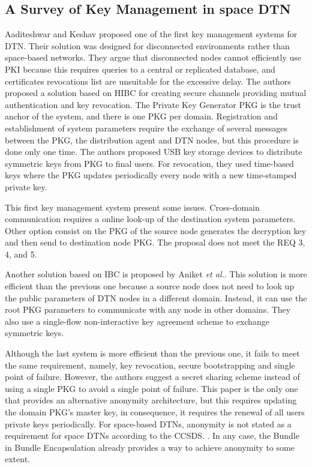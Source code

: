 \subsection{A Survey of Key Management in space DTN}

Aaditeshwar and Keshav \cite{seth2005practical} proposed one of the first key management systems for DTN. Their solution was designed for disconnected environments rather than space-based networks. They argue that disconnected nodes cannot efficiently use PKI because this requires queries to a central or replicated database, and certificates revocations list are unsuitable for the excessive delay. The authors proposed a solution based on HIBC for creating secure channels providing mutual authentication and key revocation. The Private Key Generator PKG is the trust anchor of the system, and there is one PKG per domain. Registration and establishment of system parameters require the exchange of several messages between the PKG, the distribution agent and DTN nodes, but this procedure is done only one time. The authors proposed USB key storage devices to distribute symmetric keys from PKG to final users. For revocation, they used time-based keys where the PKG updates periodically every node with a new time-stamped private key. 

This first key management system present some issues. Cross-domain communication requires a online look-up of the destination system parameters. Other option consist on the PKG of the source node generates the decryption key and then send to destination node PKG. The proposal does not meet the REQ 3, 4, and 5.


Another solution based on IBC is proposed by Aniket \textit{et al.}\cite{kate2007anonymity}. This solution is more efficient than the previous one because a source node does not need to look up the public parameters of DTN nodes in a different domain. Instead, it can use the root PKG parameters to communicate with any node in other domains. They also use a single-flow non-interactive key agreement scheme to exchange symmetric keys.

Although the last system is more efficient than the previous one, it fails to meet the same requirement, namely, key revocation, secure bootstrapping and single point of failure. However, the authors suggest a secret sharing scheme instead of using a single PKG to avoid a single point of failure. This paper is the only one that provides an alternative anonymity architecture, but this requires updating the domain PKG's master key, in consequence, it requires the renewal of all users private keys periodically. For space-based DTNs, anonymity is not stated as a requirement for space DTNs according to the CCSDS. \cite{book2011space}. In any case, the Bundle in Bundle Encapsulation \cite{ietf-dtn-bibect-00} already provides a way to achieve anonymity to some extent. 

